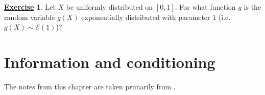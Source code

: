 \documentclass[12pt]{book}
\numberwithin{equation}{chapter}
\theoremstyle{plain}
\numberwithin{theorem}{section}
\theoremstyle{definition}
\newtheorem{exercise}{\underline{Exercise}}
\numberwithin{exercise}{chapter}
\newcommand{\<}{\langle}
\renewcommand{\>}{\rangle}
\renewcommand{\(}{\left(}
\renewcommand{\)}{\right)}
\renewcommand{\[}{\left[}
\renewcommand{\]}{\right]}
\newcommand\Ec{\mathscr{E}}
\newcommand\sig{\sigma}
\begin{document}
\begin{exercise}
\label{exer:1.7}
Let $X$ be uniformly distributed on $[0,1]$.  For what function $g$ is the random variable $g(X)$ exponentially distributed with parameter 1 (i.e. $g(X) \sim \Ec(1)$)?
\end{exercise}

%
%

\chapter{Information and conditioning}
\label{chapter:conditioning}
The notes from this chapter are taken primarily from \cite[Chapter 2]{shreve2004}.

\end{document}
